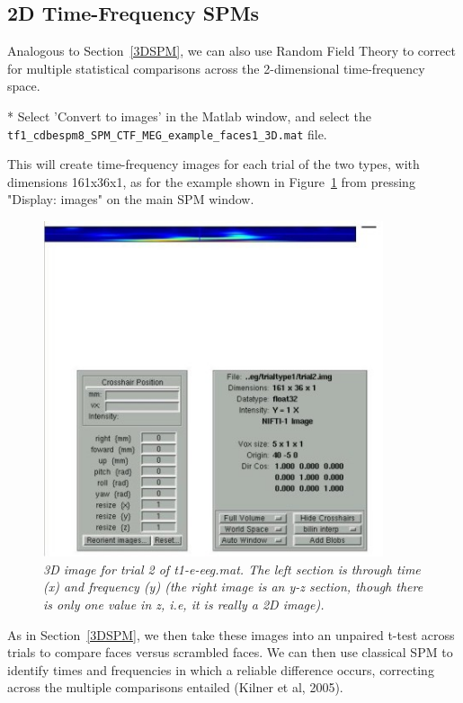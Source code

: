 \subsection{2D Time-Frequency SPMs}

Analogous to Section~\ref{3DSPM}, we can also use Random Field Theory to correct for multiple statistical comparisons across the 2-dimensional time-frequency space.

* Select 'Convert to images' in the Matlab window, and select the \verb!tf1_cdbespm8_SPM_CTF_MEG_example_faces1_3D.mat! file.

This will create time-frequency images for each trial of the two types, with dimensions 161x36x1, as for the example shown in Figure~\ref{fig_32_15} from pressing "Display: images" on the main SPM window.

\begin{figure}
\begin{center}
\includegraphics[width=100mm]{multimodal/figures/figure_32_15}
\caption{\em  3D image for trial 2 of t1-e-eeg.mat. The left section is through time (x) and frequency (y) (the right image is an y-z section, though there is only one value in z, i.e, it is really a 2D image).\label{fig_32_15}}
\end{center}
\end{figure}

As in Section~\ref{3DSPM}, we then take these images into an unpaired t-test across trials to compare faces versus scrambled faces. We can then use classical SPM to identify times and frequencies in which a reliable difference occurs, correcting across the multiple comparisons entailed (Kilner et al, 2005).

